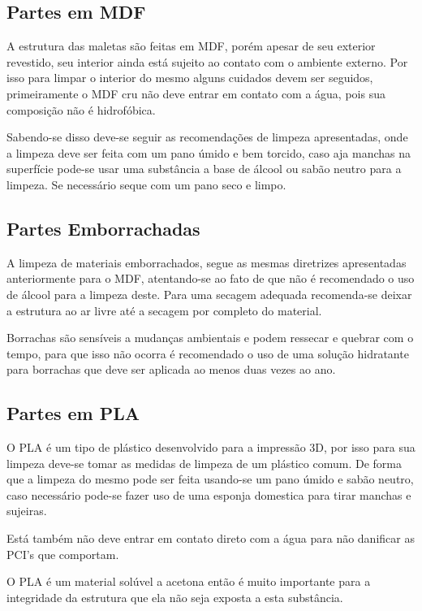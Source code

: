 \subsection*{Partes em MDF}

\par A estrutura das maletas são feitas em MDF, porém apesar de seu exterior revestido, seu interior ainda está sujeito ao contato com o ambiente externo. Por isso para limpar o interior do mesmo alguns cuidados devem ser seguidos, primeiramente o MDF cru não deve entrar em contato com a água, pois sua composição não é hidrofóbica.

\par Sabendo-se disso deve-se seguir as recomendações de limpeza apresentadas, onde a limpeza deve ser feita com um pano úmido e bem torcido, caso aja manchas na superfície pode-se usar uma substância a base de álcool ou sabão neutro para a limpeza. Se necessário seque com um pano seco e limpo.

\subsection*{Partes Emborrachadas}

\par A limpeza de materiais emborrachados, segue as mesmas diretrizes apresentadas anteriormente para o MDF, atentando-se ao fato de que não é recomendado o uso de álcool para a limpeza deste. Para uma secagem adequada recomenda-se deixar a estrutura ao ar livre até a secagem por completo do material. 

\par Borrachas são sensíveis a mudanças ambientais e podem ressecar e quebrar com o tempo, para que isso não ocorra é recomendado o uso de uma solução hidratante para borrachas que deve ser aplicada ao menos duas vezes ao ano.

\subsection*{Partes em PLA}

\par O PLA é um tipo de plástico desenvolvido para a impressão 3D, por isso para sua limpeza deve-se tomar as medidas de limpeza de um plástico comum. De forma que a limpeza do mesmo pode ser feita usando-se um pano úmido e sabão neutro, caso necessário pode-se fazer uso de uma esponja domestica para tirar manchas e sujeiras. 

\par Está também não deve entrar em contato direto com a água para não danificar as PCI's que comportam.

\par O PLA é um material solúvel a acetona então é muito importante para a integridade da estrutura que ela não seja exposta a esta substância.